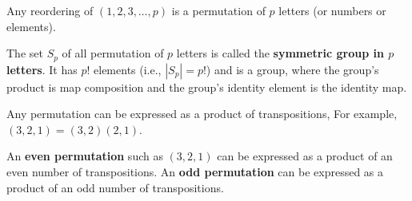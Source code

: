 Any
reordering of $(1,2,3,\ldots, p)$
is a permutation of $p$ letters (or numbers or elements).

The set $S_p$ of all permutation of
$p$ letters 
is called the {\bf symmetric group in $p$ letters}. It has $p!$ elements  (i.e., $|S_p|=p!$) and is a group,
where the group's product is map composition
and the group's identity element
is the identity map.

Any permutation can be expressed as a product of transpositions, For example,  $(3,2,1)=(3,2)(2,1)$.




An {\bf even permutation} such as
$(3,2,1)$ can be expressed as a product of an even number of 
transpositions. An {\bf odd permutation} can be expressed as a product of an odd
number of transpositions.